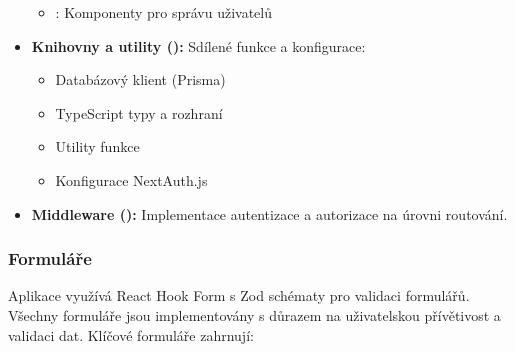 \documentclass[12pt, a4paper]{article}
\begin{document}
\begin{itemize}
\begin{itemize}
            \item {}: Komponenty pro správu uživatelů
        \end{itemize}
    \item \textbf{Knihovny a utility ():} Sdílené funkce a konfigurace:
        \begin{itemize}
            \item Databázový klient (Prisma)
            \item TypeScript typy a rozhraní
            \item Utility funkce
            \item Konfigurace NextAuth.js
        \end{itemize}
    \item \textbf{Middleware ():} Implementace autentizace a autorizace na úrovni routování.
\end{itemize}

\subsubsection{Formuláře}
\label{subsubsec:formulare}

Aplikace využívá React Hook Form s Zod schématy pro validaci formulářů. Všechny formuláře jsou implementovány s důrazem na uživatelskou přívětivost a validaci dat. Klíčové formuláře zahrnují:
\end{document}
